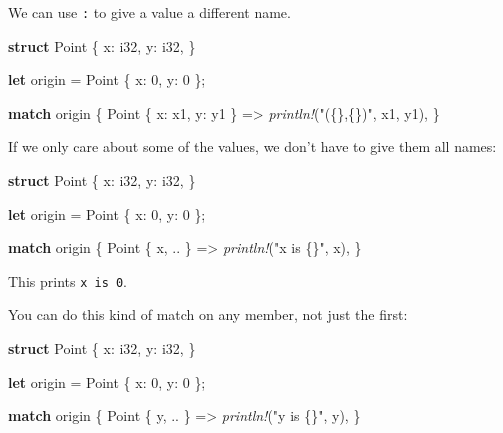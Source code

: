 \documentclass[a4paper,]{book}
\newenvironment{Shaded}{\begin{snugshade}}{\end{snugshade}}
\newcommand{\KeywordTok}[1]{\textcolor[rgb]{0.13,0.29,0.53}{\textbf{{#1}}}}
\newcommand{\DataTypeTok}[1]{\textcolor[rgb]{0.13,0.29,0.53}{{#1}}}
\newcommand{\DecValTok}[1]{\textcolor[rgb]{0.00,0.00,0.81}{{#1}}}
\newcommand{\StringTok}[1]{\textcolor[rgb]{0.31,0.60,0.02}{{#1}}}
\newcommand{\PreprocessorTok}[1]{\textcolor[rgb]{0.56,0.35,0.01}{\textit{{#1}}}}
\newcommand{\NormalTok}[1]{{#1}}
\begin{document}
We can use \texttt{:} to give a value a different name.

\begin{Shaded}
\begin{Highlighting}[]
\KeywordTok{struct} \NormalTok{Point \{}
    \NormalTok{x: }\DataTypeTok{i32}\NormalTok{,}
    \NormalTok{y: }\DataTypeTok{i32}\NormalTok{,}
\NormalTok{\}}

\KeywordTok{let} \NormalTok{origin = Point \{ x: }\DecValTok{0}\NormalTok{, y: }\DecValTok{0} \NormalTok{\};}

\KeywordTok{match} \NormalTok{origin \{}
    \NormalTok{Point \{ x: x1, y: y1 \} => }\PreprocessorTok{println!}\NormalTok{(}\StringTok{"(\{\},\{\})"}\NormalTok{, x1, y1),}
\NormalTok{\}}
\end{Highlighting}
\end{Shaded}

If we only care about some of the values, we don't have to give them all
names:

\begin{Shaded}
\begin{Highlighting}[]
\KeywordTok{struct} \NormalTok{Point \{}
    \NormalTok{x: }\DataTypeTok{i32}\NormalTok{,}
    \NormalTok{y: }\DataTypeTok{i32}\NormalTok{,}
\NormalTok{\}}

\KeywordTok{let} \NormalTok{origin = Point \{ x: }\DecValTok{0}\NormalTok{, y: }\DecValTok{0} \NormalTok{\};}

\KeywordTok{match} \NormalTok{origin \{}
    \NormalTok{Point \{ x, .. \} => }\PreprocessorTok{println!}\NormalTok{(}\StringTok{"x is \{\}"}\NormalTok{, x),}
\NormalTok{\}}
\end{Highlighting}
\end{Shaded}

This prints \texttt{x\ is\ 0}.

You can do this kind of match on any member, not just the first:

\begin{Shaded}
\begin{Highlighting}[]
\KeywordTok{struct} \NormalTok{Point \{}
    \NormalTok{x: }\DataTypeTok{i32}\NormalTok{,}
    \NormalTok{y: }\DataTypeTok{i32}\NormalTok{,}
\NormalTok{\}}

\KeywordTok{let} \NormalTok{origin = Point \{ x: }\DecValTok{0}\NormalTok{, y: }\DecValTok{0} \NormalTok{\};}

\KeywordTok{match} \NormalTok{origin \{}
    \NormalTok{Point \{ y, .. \} => }\PreprocessorTok{println!}\NormalTok{(}\StringTok{"y is \{\}"}\NormalTok{, y),}
\NormalTok{\}}
\end{Highlighting}
\end{Shaded}
\end{document}
